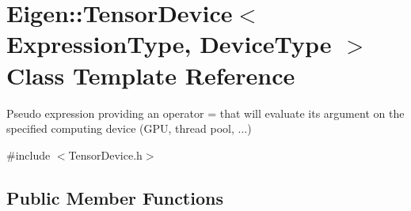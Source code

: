 \hypertarget{class_eigen_1_1_tensor_device}{}\section{Eigen\+:\+:Tensor\+Device$<$ Expression\+Type, Device\+Type $>$ Class Template Reference}
\label{class_eigen_1_1_tensor_device}


Pseudo expression providing an operator = that will evaluate its argument on the specified computing \textquotesingle{}device\textquotesingle{} (G\+PU, thread pool, ...)  




{\ttfamily \#include $<$Tensor\+Device.\+h$>$}

\subsection*{Public Member Functions}
